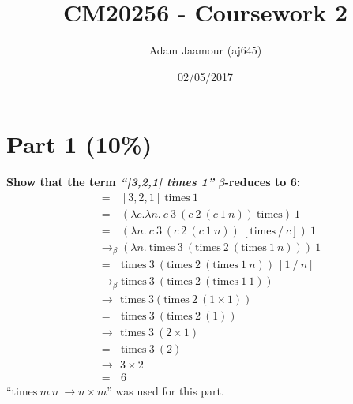 \documentclass{article}
\title{CM20256 - Coursework 2}
\date{02/05/2017}
\author{Adam Jaamour (aj645)}
\begin{document}

	\newcommand{\lamb}{$\lambda$}
	\newcommand{\la}{\lambda}
	\newcommand{\be}{$\beta$}
	
	\newcommand{\sa}{\quad}
	\newcommand{\saq}{\, \, \, \,}	
	
	\newcommand{\equals}{\rightarrow_\beta}
	\newcommand{\equalsT}{\sa \rightarrow_\beta^*\sa}
	
	\newcommand{\tim}{\text{times}}
	
	\maketitle
	\newpage
	
	\tableofcontents
	\newpage
	
	
	
	\section{Part 1 (10\%)}

	\begin{Large}
		\textbf{Show that the term \textit{``[3,2,1] times 1''} $\beta$-reduces to 6:}
		\begin{align*}
			&= \saq [3,2,1] \ \tim \ 1 \\
			&= \saq (\la c. \la n . \ c \ 3 \ (c \ 2 \ (c \ 1 \ n)) \ \tim ) \ 1 \\
			&= \saq (\la n . \ c \ 3 \ (c \ 2 \ (c \ 1 \ n)) \ [\tim \ / \ c ]) \ 1 \\
			&\equals (\la n . \ \tim \ 3 \ (\tim \ 2 \ (\tim \ 1 \ n))) \ 1 \\
			&= \saq \tim \ 3 \ (\tim \ 2 \ (\tim \ 1 \ n)) \ [1 \ / \ n] \\
			&\equals \tim \ 3 \ (\tim \ 2 \ (\tim \ 1 \ 1)) \\
			&\rightarrow \: \, \tim \ 3(\tim \ 2 \ (1 \times 1)) \\
			&= \saq \tim \ 3 \ (\tim \ 2 \ (1)) \\
			&\rightarrow \: \, \tim \ 3 \ (2 \times 1) \\
			&= \saq \tim \ 3 \ (2) \\
			&\rightarrow \: \, 3 \times 2 \\
			&= \saq 6
		\end{align*}
		``$\tim \ m \ n \ \rightarrow n \times m$'' was used for this part.
	\end{Large}
	\newpage
	
\end{document}
